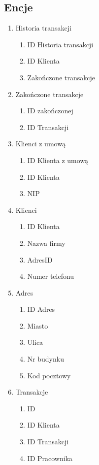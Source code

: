 \subsection{Encje}
	\begin{enumerate}

		\item Historia transakcji
		\begin{enumerate}
			\item ID Historia transakcji
			\item ID Klienta
			\item Zakończone transakcje
		\end{enumerate}

		\item Zakończone transakcje
		\begin{enumerate}
			\item ID zakończonej
			\item ID Transakcji
		\end{enumerate}

		\item Klienci z umową
		\begin{enumerate}
			\item ID Klienta z umową
			\item ID Klienta
			\item NIP
		\end{enumerate}

		\item Klienci
		\begin{enumerate}
			\item ID Klienta
			\item Nazwa firmy
			\item AdresID
			\item Numer telefonu
		\end{enumerate}

		\item Adres
		\begin{enumerate}
			\item ID Adres
			\item Miasto
			\item Ulica
			\item Nr budynku
			\item Kod pocztowy
		\end{enumerate}

		\item Transakcje
		\begin{enumerate}
			\item ID
			\item ID Klienta
			\item ID Transakcji
			\item ID Pracownika
		\end{enumerate}


\end{enumerate}
